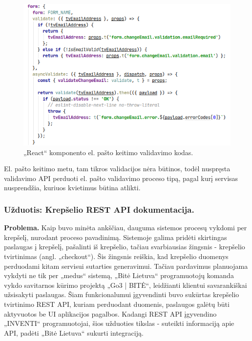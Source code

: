 \begin{figure}[H]
    \centering
    \includegraphics[scale=0.7]{img/email-validate.png}
    \caption{„React“ komponento el. pašto keitimo validavimo kodas.}
    \label{img:email-validate}
\end{figure}

El. pašto keitimo metu, tam tikros validacijos nėra būtinos, todėl nuspręsta validavimo API perduoti el. pašto validavimo proceso tipą, pagal kurį servisas nusprendžia,
kuriuos kvietimus būtina atlikti.


\subsubsection{Užduotis: Krepšelio REST API dokumentacija.}

\textbf{Problema.}
Kaip buvo minėta ankščiau, dauguma sistemos procesų vykdomi per krepšelį, nurodant proceso pavadinimą. Sistemoje galima pridėti skirtingas paslaugas į krepšelį,
pašalinti iš krepšelio, tačiau svarbiausias žingsnis - krepšelio tvirtinimas (angl. „checkout“). Šis žingsnis reiškia, kad krepšelio duomenys perduodami kitam servisui sutarties
generavimui. Tačiau pardavimus planuojama vykdyti ne tik per „medus“ sistemą, „Bitė Lietuva“ programuotojų komanda vykdo savitarnos kūrimo projektą „Go3 | BITĖ“, leidžianti
klientui savarankiškai užsisakyti paslaugas. Šiam funkcionalumui įgyvendinti buvo sukūrtas krepšelio tvirtinimo REST API, kuriam perduodant duomenis, paslaugos galėtų būti aktyvuotos
be UI aplikacijos pagalbos. Kadangi REST API įgyvendino „INVENTI“ programuotojai, šios užduoties tikslas - suteikti informaciją apie API, padėti „Bitė Lietuva“ sukurti integraciją.

